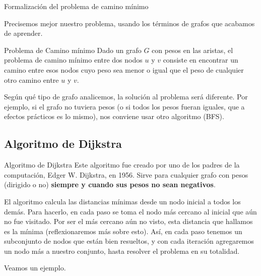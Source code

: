 \documentclass[compress]{beamer}
\begin{document}
\begin{frame}{Formalización del problema de camino mínimo}

Precisemos mejor nuestro problema, usando los términos de grafos que
acabamos de aprender.

\begin{block}{Problema de Camino m\'inimo}
Dado un grafo $G$ con pesos en las aristas, el problema de
camino mínimo entre dos nodos $u$ y $v$ consiste en encontrar un camino
entre esos nodos cuyo peso sea menor o igual que el peso de cualquier
otro camino entre $u$ y $v$.
\end{block}

\bigskip

Según qué tipo de grafo analicemos, la solución al problema será diferente.
Por ejemplo, si el grafo no tuviera pesos (o si todos los pesos fueran iguales,
que a efectos prácticos es lo mismo), nos conviene usar otro algoritmo (BFS).

\end{frame}

\subsection{Algoritmo de Dijkstra}
\begin{frame}{Algoritmo de Dijkstra}
Este algoritmo fue creado por uno de los padres de la computación,
Edger W. Dijkstra, en 1956. Sirve para cualquier grafo con pesos (dirigido
o no) \textbf{siempre y cuando sus pesos no sean negativos}.

\bigskip

El algoritmo calcula las distancias mínimas desde un nodo inicial a todos 
los demás. Para hacerlo, en cada paso se toma el nodo más cercano al inicial
que aún no fue visitado. Por ser el más cercano aún no visto, esta distancia
que hallamos es la mínima (reflexionaremos más sobre esto). Así, en cada
paso tenemos un subconjunto de nodos que están bien resueltos, y con cada
iteración agregaremos un nodo más a nuestro conjunto, hasta resolver el 
problema en su totalidad.

\bigskip

Veamos un ejemplo.
\end{frame}
\end{document}
